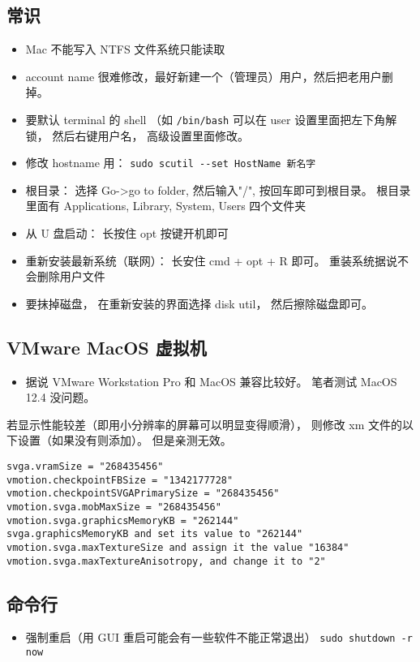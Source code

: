 \subsection{常识}
\begin{itemize}
\item Mac 不能写入 NTFS 文件系统只能读取
\item account name 很难修改，最好新建一个（管理员）用户，然后把老用户删掉。
\item 要默认 terminal 的 shell （如 \verb|/bin/bash| 可以在 user 设置里面把左下角解锁， 然后右键用户名， 高级设置里面修改。
\item 修改 hostname 用： \verb|sudo scutil --set HostName 新名字|
\item 根目录： 选择 Go->go to folder, 然后输入"/", 按回车即可到根目录。 根目录里面有 Applications, Library, System, Users 四个文件夹
\item 从 U 盘启动： 长按住 opt 按键开机即可
\item 重新安装最新系统（联网）： 长安住 cmd + opt + R 即可。 重装系统据说不会删除用户文件
\item 要抹掉磁盘， 在重新安装的界面选择 disk util， 然后擦除磁盘即可。
\end{itemize}

\subsection{VMware MacOS 虚拟机}
\begin{itemize}
\item 据说 VMware Workstation Pro 和 MacOS 兼容比较好。 笔者测试 MacOS 12.4 没问题。
\end{itemize}

若显示性能较差（即用小分辨率的屏幕可以明显变得顺滑）， 则修改 xm 文件的以下设置（如果没有则添加）。 但是亲测无效。
\begin{lstlisting}[language=none]
svga.vramSize = "268435456"
vmotion.checkpointFBSize = "1342177728"
vmotion.checkpointSVGAPrimarySize = "268435456"
vmotion.svga.mobMaxSize = "268435456"
vmotion.svga.graphicsMemoryKB = "262144"
svga.graphicsMemoryKB and set its value to "262144"
vmotion.svga.maxTextureSize and assign it the value "16384"
vmotion.svga.maxTextureAnisotropy, and change it to "2"
\end{lstlisting}

\subsection{命令行}
\begin{itemize}
\item 强制重启（用 GUI 重启可能会有一些软件不能正常退出） \verb|sudo shutdown -r now|
\end{itemize}

